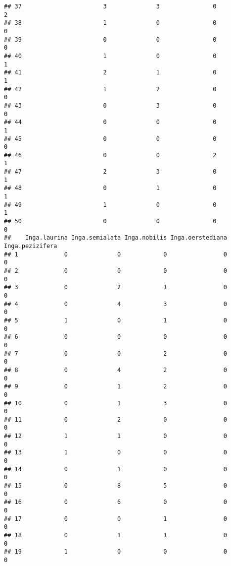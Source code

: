 \documentclass[
]{article}
\begin{document}
\begin{verbatim}
## 37                       3              3               0              2
## 38                       1              0               0              0
## 39                       0              0               0              0
## 40                       1              0               0              1
## 41                       2              1               0              1
## 42                       1              2               0              0
## 43                       0              3               0              0
## 44                       0              0               0              1
## 45                       0              0               0              0
## 46                       0              0               2              1
## 47                       2              3               0              1
## 48                       0              1               0              1
## 49                       1              0               0              1
## 50                       0              0               0              0
##    Inga.laurina Inga.semialata Inga.nobilis Inga.oerstediana Inga.pezizifera
## 1             0              0            0                0               0
## 2             0              0            0                0               0
## 3             0              2            1                0               0
## 4             0              4            3                0               0
## 5             1              0            1                0               0
## 6             0              0            0                0               0
## 7             0              0            2                0               0
## 8             0              4            2                0               0
## 9             0              1            2                0               0
## 10            0              1            3                0               0
## 11            0              2            0                0               0
## 12            1              1            0                0               0
## 13            1              0            0                0               0
## 14            0              1            0                0               0
## 15            0              8            5                0               0
## 16            0              6            0                0               0
## 17            0              0            1                0               0
## 18            0              1            1                0               0
## 19            1              0            0                0               0

\end{verbatim}
\end{document}
